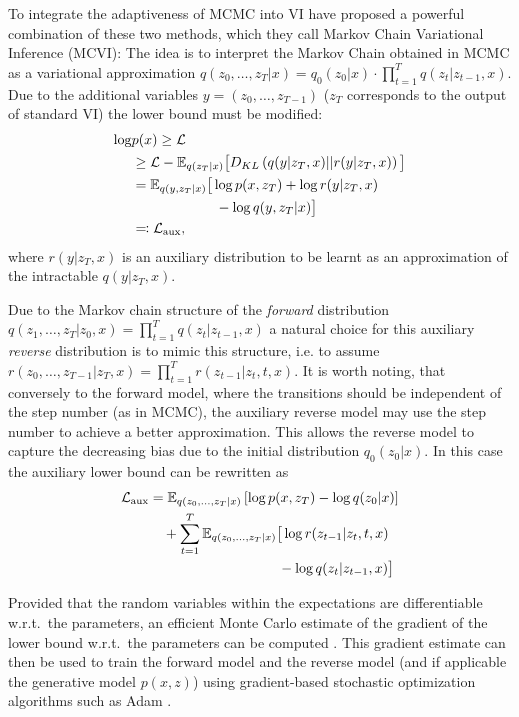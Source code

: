 To integrate the adaptiveness of MCMC into VI \textcite{Salimans2014} have proposed a powerful combination of these two methods, which they call Markov Chain Variational Inference (MCVI): The idea is to interpret the Markov Chain obtained in MCMC as a variational approximation $q(z_0, \dots, z_T|x) = q_{0}(z_0|x) \cdot \prod_{t=1}^T q(z_t|z_{t-1}, x)$. Due to the additional variables $y = (z_0, \dots, z_{T-1})$ ($z_T$ corresponds to the output of standard VI) the lower bound must be modified:
\begin{equation}
\begin{split}
\log &p(x) \geq \mathcal{L} \\
	   &\geq \mathcal{L} - \mathbb{E}_{q(z_T|x)} \big[ D_{KL} \left( q(y |z_T, x) || r(y|z_T, x) \right) \big] \\
	   &=  \mathbb{E}_{q(y, z_T|x)} \big[ \log p(x, z_T) + \log r(y |z_T, x) \\
	   &\qquad\qquad\qquad  - \log q(y, z_{T} |x) \big] \\
	   &\eqqcolon \mathcal{L}_{\textrm{aux}},
\end{split}
\end{equation}
where $r(y|z_T, x)$ is an auxiliary distribution to be learnt as an approximation of the intractable $q(y |z_T, x)$. 

Due to the Markov chain structure of the \textit{forward} distribution $q(z_1, \dots, z_T|z_0, x) = \prod_{t=1}^T q(z_t|z_{t-1}, x)$ a natural choice for this auxiliary \textit{reverse} distribution is to mimic this structure, i.e. to assume $r(z_0, \dots, z_{T-1} |z_T, x) = \prod_{t=1}^T r(z_{t-1}|z_t, t, x)$. It is worth noting, that conversely to the forward model, where the transitions should be independent of the step number (as in MCMC), the auxiliary reverse model may use the step number to achieve a better approximation. This allows the reverse model to capture the decreasing bias due to the initial distribution $q_0(z_0|x)$. In this case the auxiliary lower bound can be rewritten as
\begin{equation} \label{eq:MCVIAuxLowerBound}
\begin{split}
\mathcal{L}_{\textrm{aux}} &= \mathbb{E}_{q(z_0, \dots, z_T|x)} \left[ \log p(x, z_T) - \log q(z_0|x) \right] \\
& \quad + \sum_{t=1}^T \mathbb{E}_{q(z_0, \dots, z_T|x)} \big[ \log r(z_{t-1}|z_t, t, x) \\
& \quad\qquad\qquad\qquad\qquad\; - \log q(z_t|z_{t-1}, x)  \big] 
\end{split}
\end{equation}

Provided that the random variables within the expectations are differentiable w.r.t.\ the parameters, an efficient Monte Carlo estimate of the gradient of the lower bound w.r.t.\ the parameters can be computed \parencite{Kingma2014, Rezende2014}. This gradient estimate can then be used to train the forward model and the reverse model (and if applicable the generative model $p(x, z)$) using gradient-based stochastic optimization algorithms such as Adam \parencite{Kingma2015}.
